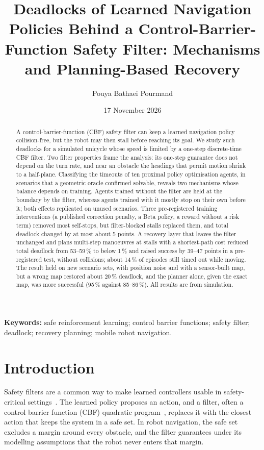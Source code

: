 \documentclass[11pt]{article}
\title{Deadlocks of Learned Navigation Policies Behind a Control-Barrier-Function Safety Filter: Mechanisms and Planning-Based Recovery}
\author{Pouya Bathaei Pourmand\\[2pt]\small \authorcheck{affiliation, postal address, e-mail and ORCID}}
\date{17 November 2026}
\theoremstyle{definition}
\theoremstyle{remark}
\begin{document}
\maketitle

\begin{abstract}
A control-barrier-function (CBF) safety filter can keep a learned navigation policy collision-free, but the robot may then stall before reaching its goal. We study such deadlocks for a simulated unicycle whose speed is limited by a one-step discrete-time CBF filter. Two filter properties frame the analysis: its one-step guarantee does not depend on the turn rate, and near an obstacle the headings that permit motion shrink to a half-plane. Classifying the timeouts of ten proximal policy optimisation agents, in scenarios that a geometric oracle confirmed solvable, reveals two mechanisms whose balance depends on training. Agents trained without the filter are held at the boundary by the filter, whereas agents trained with it mostly stop on their own before it; both effects replicated on unused scenarios. Three pre-registered training interventions (a published correction penalty, a Beta policy, a reward without a risk term) removed most self-stops, but filter-blocked stalls replaced them, and total deadlock changed by at most about 5 points. A recovery layer that leaves the filter unchanged and plans multi-step manoeuvres at stalls with a shortest-path cost reduced total deadlock from 53--59\,\% to below 1\,\% and raised success by 39--47 points in a pre-registered test, without collisions; about 14\,\% of episodes still timed out while moving. The result held on new scenario sets, with position noise and with a sensor-built map, but a wrong map restored about 20\,\% deadlock, and the planner alone, given the exact map, was more successful (95\,\% against 85--86\,\%). All results are from simulation.
\end{abstract}

\noindent\textbf{Keywords:} safe reinforcement learning; control barrier functions; safety filter; deadlock; recovery planning; mobile robot navigation.

\section{Introduction}
Safety filters are a common way to make learned controllers usable in safety-critical settings~\cite{hsu2024safetyfilter,brunke2022safe}. The learned policy proposes an action, and a filter, often a control barrier function (CBF) quadratic program~\cite{ames2017cbfqp,ames2019cbf}, replaces it with the closest action that keeps the system in a safe set. In robot navigation, the safe set excludes a margin around every obstacle, and the filter guarantees under its modelling assumptions that the robot never enters that margin.
\end{document}
